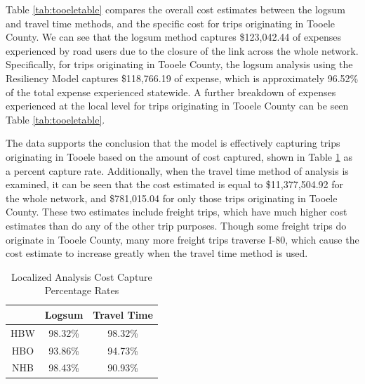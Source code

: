 Table \ref{tab:tooeletable} compares the overall cost estimates between the
logsum and travel time methods, and the specific cost for trips originating in
Tooele County. We can see that the logsum
method captures \$123,042.44 of expenses experienced by road users due to the closure of the
link across the whole network. Specifically, for trips originating in Tooele County, the logsum analysis using the Resiliency
Model captures \$118,766.19 of
expense, which is approximately 96.52\% of the total expense experienced
statewide. A further breakdown of expenses experienced at the local level
for trips originating in Tooele County
can be seen Table \ref{tab:tooeletable}.

The data supports the conclusion that the model is effectively
capturing trips originating in Tooele based on the amount of cost captured,
shown in Table \ref{tab:tooeletable2} as a percent capture rate. Additionally, when the
travel time method of analysis is examined, it can be seen that the cost estimated
is equal to \$11,377,504.92 for the whole network, and \$781,015.04 for only
those trips originating in Tooele County. These two estimates include freight
trips, which have much higher cost estimates than do any of the other trip purposes.
Though some freight trips do originate in Tooele County, many more freight trips traverse
I-80, which cause the cost estimate to increase greatly when the travel time method
is used.
\begin{table}[h]

\caption{\label{tab:tooeletable2}Localized Analysis Cost Capture Percentage Rates}
\centering
\begin{tabular}{ccc}
\toprule
 & Logsum & Travel Time\\
\midrule
HBW & 98.32\% & 98.32\% \\
HBO & 93.86\% & 94.73\% \\
NHB & 98.43\% & 90.93\% \\
\bottomrule
\end{tabular}
\end{table}


